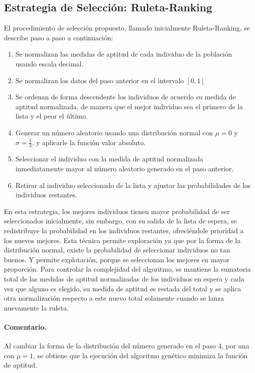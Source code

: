 \documentclass{llncs}
\begin{document}
\subsection{Estrategia de Selección: Ruleta-Ranking}
El procedimiento de selección propuesto, llamado inicialmente Ruleta-Ranking, se describe paso a paso a continuación:
\begin{enumerate}
\item Se normalizan las medidas de aptitud de cada individuo de la población usando escala decimal.
\item Se normalizan los datos del paso anterior en el intervalo $[0,1]$
\item Se ordenan de forma descendente los individuos de acuerdo su medida de aptitud normalizada, de manera que el mejor individuo sea el primero de la lista y el peor el último.
\item Generar un número aleatorio usando una distribución normal con $\mu=0$ y $\sigma=\frac{1}{3}$, y aplicarle la función valor absoluto.
\item Seleccionar el individuo con la medida de aptitud normalizada inmediatamente mayor al número aleatorio generado en el paso anterior.
\item Retirar al individuo seleccionado de la lista y ajustar las probabilidades de los individuos restantes.
\end{enumerate}
En esta estrategia, los mejores individuos tienen mayor probabilidad de ser seleccionados inicialmente, sin embargo, con su salida de la lista de espera, se redistribuye la probabilidad en los individuos restantes, ofreciéndole prioridad a los nuevos mejores. Esta técnica permite exploración ya que por la forma de la distribución normal, existe la probabilidad de seleccionar individuos no tan buenos. Y permite explotación, porque se seleccionan los mejores en mayor proporción. 
Para controlar la complejidad del algoritmo, se mantiene la sumatoria total de las medidas de aptitud normalizadas de los individuos en espera y cada vez que alguno es elegido, su medida de aptitud es restada del total y se aplica otra normalización respecto a este nuevo total solamente cuando se lanza nuevamente la ruleta.

\paragraph{Comentario.}
Al cambiar la forma de la distribución del número generado en el paso $4$, por una con $\mu=1$, se obtiene que la ejecución del algoritmo genético minimiza la función de aptitud.
\end{document}

